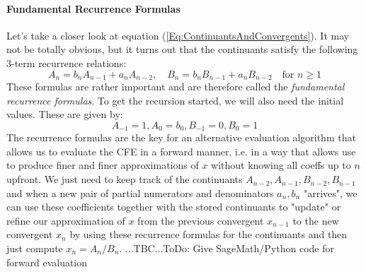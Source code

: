 \paragraph{Fundamental Recurrence Formulas}
Let's take a closer look at equation (\ref{Eq:ContinuantsAndConvergents}). It may not be totally obvious, but it turns out that the continuants satisfy the following 3-term recurrence relations:
\begin{equation}
A_n = b_n A_{n-1} + a_n A_{n-2}, \quad
B_n = b_n B_{n-1} + a_n B_{n-2}  \quad
\text{for }  n \geq 1
\end{equation}
These formulas are rather important and are therefore called the \emph{fundamental recurrence formulas}.
To get the recursion started, we will also need the initial values. These are given by:
\begin{equation}
A_{-1} = 1, A_0 = b_0, B_{-1} = 0, B_0 = 1
\end{equation}
The recurrence formulas are the key for an alternative evaluation algorithm that allows us to evaluate the CFE in a forward manner, i.e. in a way that allows use to produce finer and finer approximations of $x$ without knowing all coeffs up to $n$ upfront. We just need to keep track of the continuants $A_{n-2}, A_{n-1}, B_{n-2}, B_{n-1}$ and when a new pair of partial numerators and denominators $a_n, b_n$ "arrives", we can use these coefficients together with the stored continuants to "update" or refine our approximation of $x$ from the previous convergent $x_{n-1}$ to the new convergent $x_n$ by using these recurrence formulas for the continuants and then just compute $x_n = A_n/B_n$. ...TBC...ToDo: Give SageMath/Python code for forward evaluation




